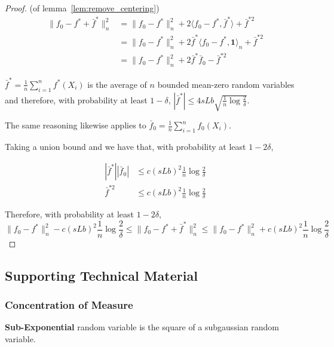 \begin{proof} (of lemma~\ref{lem:remove_centering})
\begin{align*}
\| f_0 - f^* + \bar{f}^* \|_n^2 &= \| f_0 - f^* \|_n^2 
    + 2 \langle f_0 - f^*, \bar{f}^* \rangle + \bar{f}^{*2} \\
  &= \| f_0 - f^* \|_n^2 + 2 \bar{f}^* \langle f_0 - f^*, \mathbf{1} \rangle_n + 
    \bar{f}^{*2} \\
  &= \| f_0 - f^* \|_n^2 + 2 \bar{f}^* \bar{f}_0 - \bar{f}^{*2}
\end{align*}


$\bar{f}^* = \frac{1}{n} \sum_{i=1}^n f^*(X_i)$ is the average of $n$ bounded mean-zero random variables and therefore, with probability at least $1-\delta$, $| \bar{f}^* | \leq 4 s L b \sqrt{ \frac{1}{n} \log \frac{2}{\delta} }$.

The same reasoning likewise applies to $\bar{f}_0 = \frac{1}{n} \sum_{i=1}^n f_0(X_i)$.

Taking a union bound and we have that, with probability at least $1- 2\delta$, 

\begin{align*}
| \bar{f}^* | | \bar{f}_0 | &\leq c (sLb)^2 \frac{1}{n} \log \frac{2}{\delta} \\
\bar{f}^{*2} &\leq c (sLb)^2 \frac{1}{n} \log \frac{2}{\delta}
\end{align*}

Therefore, with probability at least $1 - 2\delta$,
\[
\|f_0 - f^*\|_n^2 - c (sLb)^2 \frac{1}{n} \log \frac{2}{\delta} \leq
    \| f_0 - f^* + \bar{f}^* \|_n^2 \leq 
\|f_0 - f^*\|_n^2 + c (sLb)^2 \frac{1}{n} \log \frac{2}{\delta}
\]

\end{proof}





 \subsection{Supporting Technical Material}
 
 \subsubsection{Concentration of Measure}

\textbf{Sub-Exponential} random variable is the square of a subgaussian random variable\cite{vershynin2010introduction}.

